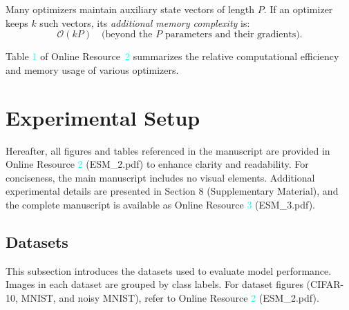 \documentclass[10pt,twocolumn]{article}
\begin{document}
Many optimizers maintain auxiliary state vectors of length $P$.  If an optimizer keeps $k$ such vectors, its \emph{additional memory complexity} is:
\[
  \mathcal{O}(kP)
  \quad\text{(beyond the $P$ parameters and their gradients).}
\]

Table \textcolor{cyan}{1} of Online Resource~\textcolor{cyan}{2} summarizes the relative computational efficiency and memory usage of various optimizers.


\section{Experimental Setup}\label{Sec 4}

Hereafter, all figures and tables referenced in the manuscript are provided in Online Resource \textcolor{cyan}{2} (ESM\_2.pdf) to enhance clarity and readability. For conciseness, the main manuscript includes no visual elements. Additional experimental details are presented in Section 8 (Supplementary Material), and the complete manuscript is available as Online Resource \textcolor{cyan}{3} (ESM\_3.pdf).

%

\subsection{Datasets}

This subsection introduces the datasets used to evaluate model performance. Images in each dataset are grouped by class labels. For dataset figures (CIFAR-10, MNIST, and noisy MNIST), refer to Online Resource \textcolor{cyan}{2} (ESM\_2.pdf).
\end{document}
